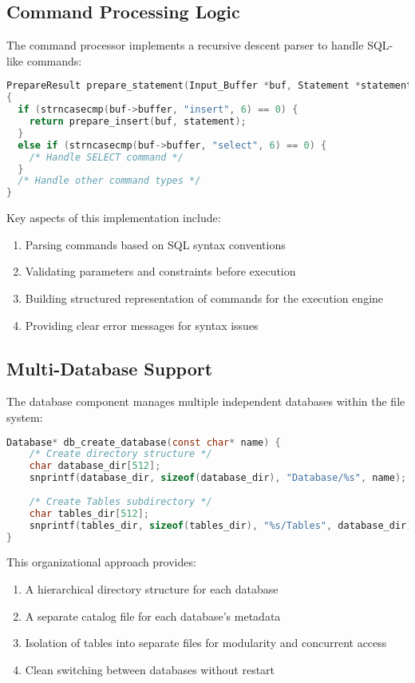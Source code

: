 \documentclass[12pt,a4paper]{article}  %
\begin{document}
\subsection{Command Processing Logic}

The command processor implements a recursive descent parser to handle SQL-like commands:

\begin{lstlisting}[language=C]
PrepareResult prepare_statement(Input_Buffer *buf, Statement *statement)
{
  if (strncasecmp(buf->buffer, "insert", 6) == 0) {
    return prepare_insert(buf, statement);
  }
  else if (strncasecmp(buf->buffer, "select", 6) == 0) {
    /* Handle SELECT command */
  }
  /* Handle other command types */
}
\end{lstlisting}

Key aspects of this implementation include:
\begin{enumerate}
    \item Parsing commands based on SQL syntax conventions
    \item Validating parameters and constraints before execution
    \item Building structured representation of commands for the execution engine
    \item Providing clear error messages for syntax issues
\end{enumerate}

\subsection{Multi-Database Support}

The database component manages multiple independent databases within the file system:

\begin{lstlisting}[language=C]
Database* db_create_database(const char* name) {
    /* Create directory structure */
    char database_dir[512];
    snprintf(database_dir, sizeof(database_dir), "Database/%s", name);
    
    /* Create Tables subdirectory */
    char tables_dir[512];
    snprintf(tables_dir, sizeof(tables_dir), "%s/Tables", database_dir);
}
\end{lstlisting}

This organizational approach provides:
\begin{enumerate}
    \item A hierarchical directory structure for each database
    \item A separate catalog file for each database's metadata
    \item Isolation of tables into separate files for modularity and concurrent access
    \item Clean switching between databases without restart
\end{enumerate}
\end{document}
